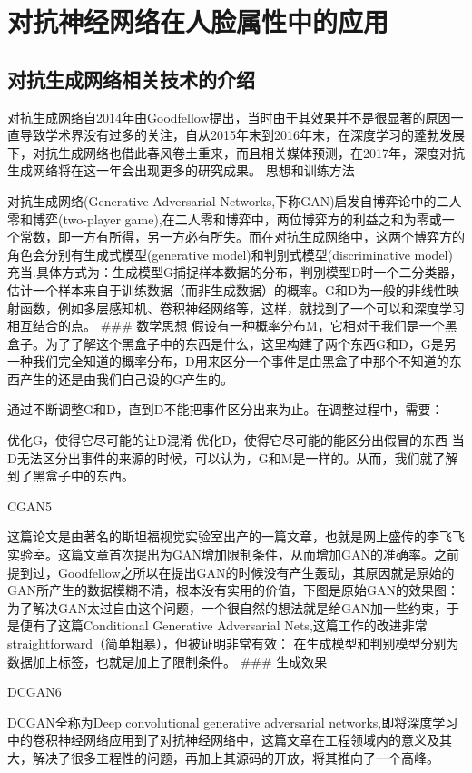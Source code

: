 \chapter{对抗神经网络在人脸属性中的应用}
\section{对抗生成网络相关技术的介绍}
对抗生成网络自2014年由Goodfellow提出，当时由于其效果并不是很显著的原因一直导致学术界没有过多的关注，自从2015年末到2016年末，在深度学习的蓬勃发展下，对抗生成网络也借此春风卷土重来，而且相关媒体预测，在2017年，深度对抗生成网络将在这一年会出现更多的研究成果。
思想和训练方法

对抗生成网络(Generative Adversarial Networks,下称GAN)启发自博弈论中的二人零和博弈(two-player game),在二人零和博弈中，两位博弈方的利益之和为零或一个常数，即一方有所得，另一方必有所失。而在对抗生成网络中，这两个博弈方的角色会分别有生成式模型(generative model)和判别式模型(discriminative model)充当.具体方式为：生成模型G捕捉样本数据的分布，判别模型D时一个二分类器，估计一个样本来自于训练数据（而非生成数据）的概率。G和D为一般的非线性映射函数，例如多层感知机、卷积神经网络等，这样，就找到了一个可以和深度学习相互结合的点。 ### 数学思想 假设有一种概率分布M，它相对于我们是一个黑盒子。为了了解这个黑盒子中的东西是什么，这里构建了两个东西G和D，G是另一种我们完全知道的概率分布，D用来区分一个事件是由黑盒子中那个不知道的东西产生的还是由我们自己设的G产生的。

通过不断调整G和D，直到D不能把事件区分出来为止。在调整过程中，需要：

优化G，使得它尽可能的让D混淆
优化D，使得它尽可能的能区分出假冒的东西
当D无法区分出事件的来源的时候，可以认为，G和M是一样的。从而，我们就了解到了黑盒子中的东西。

CGAN5

这篇论文是由著名的斯坦福视觉实验室出产的一篇文章，也就是网上盛传的李飞飞实验室。这篇文章首次提出为GAN增加限制条件，从而增加GAN的准确率。之前提到过，Goodfellow之所以在提出GAN的时候没有产生轰动，其原因就是原始的GAN所产生的数据模糊不清，根本没有实用的价值，下图是原始GAN的效果图：
为了解决GAN太过自由这个问题，一个很自然的想法就是给GAN加一些约束，于是便有了这篇Conditional Generative Adversarial Nets,这篇工作的改进非常straightforward（简单粗暴），但被证明非常有效：
在生成模型和判别模型分别为数据加上标签，也就是加上了限制条件。 ### 生成效果

DCGAN6

DCGAN全称为Deep convolutional generative adversarial networks,即将深度学习中的卷积神经网络应用到了对抗神经网络中，这篇文章在工程领域内的意义及其大，解决了很多工程性的问题，再加上其源码的开放，将其推向了一个高峰。

